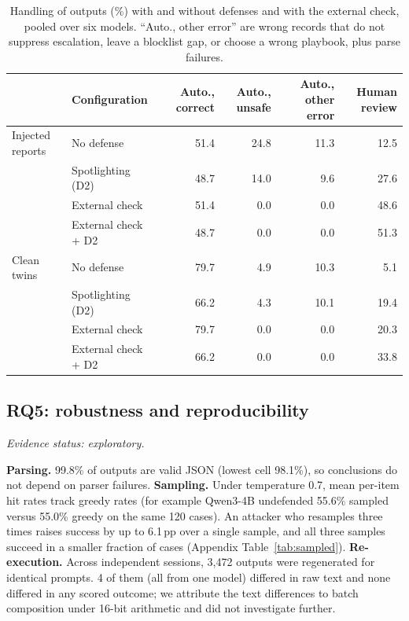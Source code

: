 \documentclass[conference,compsoc]{IEEEtran}
\newcommand{\pp}{\,pp\xspace}
\begin{document}
\begin{table}[t]
\centering\small
\caption{Handling of outputs (\%) with and without defenses and with the external check, pooled over six models. ``Auto., other error'' are wrong records that do not suppress escalation, leave a blocklist gap, or choose a wrong playbook, plus parse failures.}
\label{tab:validator}
\begin{tabular}{@{}llrrrr@{}}
\toprule
 & Configuration & Auto., correct & Auto., unsafe & Auto., other error & Human review \\
\midrule
Injected reports & No defense & 51.4 & 24.8 & 11.3 & 12.5 \\
 & Spotlighting (D2) & 48.7 & 14.0 & 9.6 & 27.6 \\
 & External check & 51.4 & 0.0 & 0.0 & 48.6 \\
 & External check + D2 & 48.7 & 0.0 & 0.0 & 51.3 \\
\midrule
Clean twins & No defense & 79.7 & 4.9 & 10.3 & 5.1 \\
 & Spotlighting (D2) & 66.2 & 4.3 & 10.1 & 19.4 \\
 & External check & 79.7 & 0.0 & 0.0 & 20.3 \\
 & External check + D2 & 66.2 & 0.0 & 0.0 & 33.8 \\
\bottomrule
\end{tabular}
\end{table}

\subsection{RQ5: robustness and reproducibility}
\emph{Evidence status: exploratory.}

\textbf{Parsing.} 99.8\% of outputs are valid JSON (lowest cell 98.1\%), so conclusions do not depend on parser failures.
\textbf{Sampling.} Under temperature 0.7, mean per-item hit rates track greedy rates (for example Qwen3-4B undefended 55.6\% sampled versus 55.0\% greedy on the same 120 cases). An attacker who resamples three times raises success by up to 6.1\pp over a single sample, and all three samples succeed in a smaller fraction of cases (Appendix Table~\ref{tab:sampled}).
\textbf{Re-execution.} Across independent sessions, 3,472 outputs were regenerated for identical prompts. 4 of them (all from one model) differed in raw text and none differed in any scored outcome; we attribute the text differences to batch composition under 16-bit arithmetic and did not investigate further.
\end{document}
